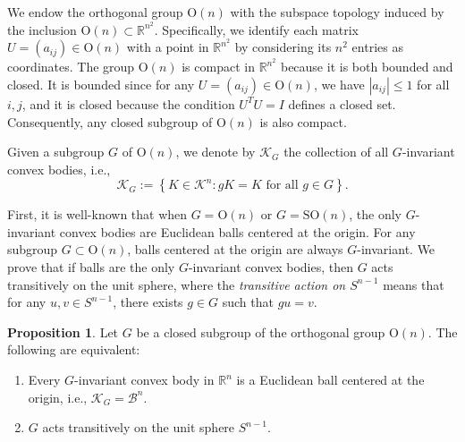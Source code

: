 \documentclass[12pt, reqno]{amsart}
\theoremstyle{definition}
\newtheorem{proposition}[theorem]{Proposition}
\theoremstyle{remark}
\numberwithin{equation}{section}
\newcommand{\R}{\mathbb{R}}
\newcommand{\Sn}{S^{n-1}}
\newcommand{\On}{\mathrm{O}(n)}
\newcommand{\SOn}{\mathrm{SO}(n)}
\newcommand{\KG}{\mathcal{K}_{G}}
\begin{document}
	
	We endow the orthogonal group $\On$ with the subspace topology induced by the inclusion $\On \subset \mathbb{R}^{n^2}$. 
	Specifically, we identify each matrix $U = (a_{ij}) \in \On$ with a point in $\mathbb{R}^{n^2}$ by considering its $n^2$ entries as coordinates. 
The group $\On$ is compact in $\mathbb{R}^{n^2}$ because it is both bounded and closed. It is bounded since for any $U = (a_{ij}) \in \On$, we have $|a_{ij}| \leq 1$ for all $i, j$, and it is closed because the condition $U^T U = I$ defines a closed set.
	Consequently, any closed subgroup  of $\On$ is also compact.  
	
		Given a subgroup $G$ of $\On$, 
	we denote by $\KG$ the collection of all $G$-invariant convex bodies, i.e.,
	\begin{equation*}
		\KG := \left\{ K \in \mathcal{K}^n : gK = K \text{ for all } g \in G \right\}.
	\end{equation*}
	
	First, it is well-known that  when $G = \On$ or $G=\SOn$, the only $G$-invariant convex bodies 
	are Euclidean balls centered at the origin. For any subgroup $G \subset \On$, 
	balls centered at the origin are always  $G$-invariant. 
	We  prove that if balls are the only $G$-invariant convex bodies, 
	then $G$ acts transitively on the unit sphere,	where the \textit{transitive action on $\Sn$} means that for any 
	$u, v \in \Sn$, there exists $g \in G$ such that $gu = v$.
	
	
	
	\begin{proposition}\label{G=ball}
		Let \( G \) be a closed subgroup of the orthogonal group \( \On \). The following are equivalent:
		\begin{enumerate}
			\item Every \( G \)-invariant convex body in \( \R^n \) is a Euclidean ball centered at the origin, i.e., $\KG=\mathcal{B}^{n}$.
			\item \( G \) acts transitively on the unit sphere \( \Sn \).  
		\end{enumerate}
	\end{proposition}
	
\end{document}
